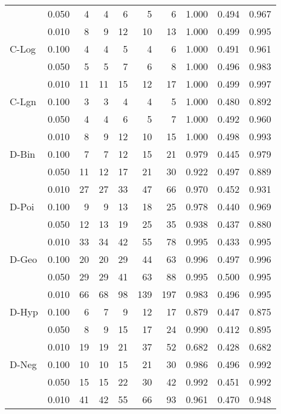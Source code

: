 \begin{tabular}{lr|rrrrr|rrr}
     & 0.050 & 4 & 4 & 6 & 5 & 6 & 1.000 & 0.494 & 0.967 \\
     & 0.010 & 8 & 9 & 12 & 10 & 13 & 1.000 & 0.499 & 0.995 \\
\hline
C-Log & 0.100 & 4 & 4 & 5 & 4 & 6 & 1.000 & 0.491 & 0.961 \\
     & 0.050 & 5 & 5 & 7 & 6 & 8 & 1.000 & 0.496 & 0.983 \\
     & 0.010 & 11 & 11 & 15 & 12 & 17 & 1.000 & 0.499 & 0.997 \\
\hline
C-Lgn & 0.100 & 3 & 3 & 4 & 4 & 5 & 1.000 & 0.480 & 0.892 \\
     & 0.050 & 4 & 4 & 6 & 5 & 7 & 1.000 & 0.492 & 0.960 \\
     & 0.010 & 8 & 9 & 12 & 10 & 15 & 1.000 & 0.498 & 0.993 \\
\hline
D-Bin & 0.100 & 7 & 7 & 12 & 15 & 21 & 0.979 & 0.445 & 0.979 \\
     & 0.050 & 11 & 12 & 17 & 21 & 30 & 0.922 & 0.497 & 0.889 \\
     & 0.010 & 27 & 27 & 33 & 47 & 66 & 0.970 & 0.452 & 0.931 \\
\hline
D-Poi & 0.100 & 9 & 9 & 13 & 18 & 25 & 0.978 & 0.440 & 0.969 \\
     & 0.050 & 12 & 13 & 19 & 25 & 35 & 0.938 & 0.437 & 0.880 \\
     & 0.010 & 33 & 34 & 42 & 55 & 78 & 0.995 & 0.433 & 0.995 \\
\hline
D-Geo & 0.100 & 20 & 20 & 29 & 44 & 63 & 0.996 & 0.497 & 0.996 \\
     & 0.050 & 29 & 29 & 41 & 63 & 88 & 0.995 & 0.500 & 0.995 \\
     & 0.010 & 66 & 68 & 98 & 139 & 197 & 0.983 & 0.496 & 0.995 \\
\hline
D-Hyp & 0.100 & 6 & 7 & 9 & 12 & 17 & 0.879 & 0.447 & 0.875 \\
     & 0.050 & 8 & 9 & 15 & 17 & 24 & 0.990 & 0.412 & 0.895 \\
     & 0.010 & 19 & 19 & 21 & 37 & 52 & 0.682 & 0.428 & 0.682 \\
\hline
D-Neg & 0.100 & 10 & 10 & 15 & 21 & 30 & 0.986 & 0.496 & 0.992 \\
     & 0.050 & 15 & 15 & 22 & 30 & 42 & 0.992 & 0.451 & 0.992 \\
     & 0.010 & 41 & 42 & 55 & 66 & 93 & 0.961 & 0.470 & 0.948 \\
\bottomrule
\end{tabular}